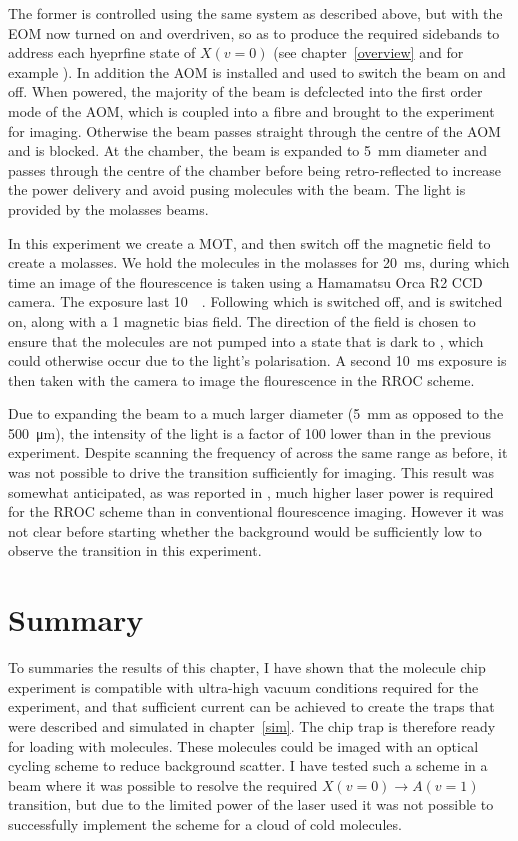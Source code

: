 The former is controlled using the same system as described above, but with the
EOM now turned on and overdriven, so as to produce the required sidebands to
address each hyeprfine state of $X(v=0)$ (see chapter~\ref{overview} and for
example ). In addition the AOM is installed and used to
switch the beam on and off. When powered, the majority of the beam is
defclected into the first order mode of the AOM, which is coupled into a fibre
and brought to the experiment for imaging. Otherwise the beam passes straight
through the centre of the AOM and is blocked. At the chamber, the beam is
expanded to \SI{5}{\milli\meter} diameter and passes through the centre of the
chamber before being retro-reflected to increase the power delivery and avoid
pusing molecules with the beam. 
%
The  light is provided by the molasses beams.

In this experiment we create a MOT, and then switch off the magnetic field to
create a molasses. We hold the molecules in the molasses for
\SI{20}{\milli\second}, during which time an image of the flourescence is taken
using a Hamamatsu Orca R2 CCD camera.
The exposure last \SI{10}{\milli\seconds}. Following which  is
switched off, and  is switched on, along with a \SI{1}{\gauss}
magnetic bias field.  The direction of the field is chosen to ensure that the
molecules are not pumped into a state that is dark to , which
could otherwise occur due to the light's polarisation. A second
\SI{10}{\milli\second} exposure is then taken with the camera to image the
flourescence in the RROC scheme.

Due to expanding the beam to a much larger diameter (\SI{5}{\milli\meter} as
opposed to the \SI{500}{\micro\meter}), the intensity of the light is a factor
of 100 lower than in the previous experiment. Despite scanning the frequency of
 across the same range as before, it was not possible to drive the
transition sufficiently for imaging. This result was somewhat anticipated, as
was reported in , much higher laser power is required for
the RROC scheme than in conventional flourescence imaging. However it was
not clear before starting whether the background would be sufficiently low to
observe the transition in this experiment.

\section{Summary}

To summaries the results of this chapter, I have shown that the molecule chip
experiment is compatible with ultra-high vacuum conditions required for the
\CaF{} experiment, and that sufficient current can be achieved to create the
traps that were described and simulated in chapter~\ref{sim}. The chip trap is
therefore ready for loading with \CaF{} molecules. These molecules could be
imaged with an optical cycling scheme to reduce background scatter. I have
tested such a scheme in a \CaF{} beam where it was possible to resolve the
required $X(v=0)\rightarrow A(v=1)$ transition, but due to the limited power of
the laser used it was not possible to successfully implement the scheme for a
cloud of cold molecules.
